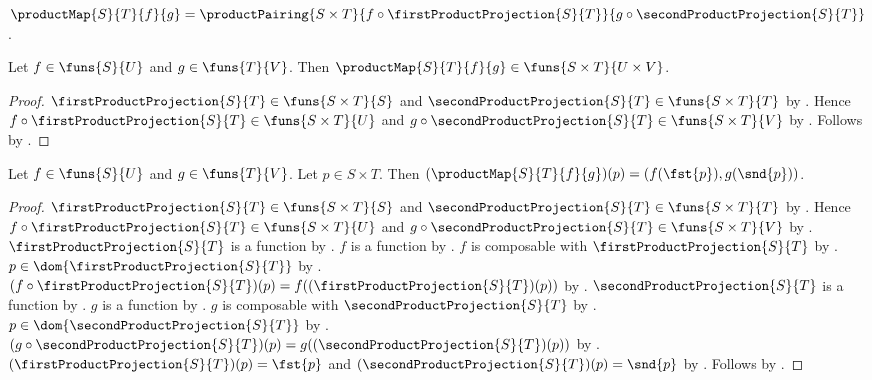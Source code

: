 \begin{definition}\label{product_map}
    $\productMap{S}{T}{f}{g}
        =\productPairing{S\times T}{
            f\circ\firstProductProjection{S}{T}}{
            g\circ\secondProductProjection{S}{T}}$.
\end{definition}

\begin{proposition}\label{product_map_type}
    Let $f\in\funs{S}{U}$ and $g\in\funs{T}{V}$.
    Then $\productMap{S}{T}{f}{g}\in
        \funs{S\times T}{U\times V}$.
\end{proposition}
\begin{proof}
    $\firstProductProjection{S}{T}\in\funs{S\times T}{S}$ and
        $\secondProductProjection{S}{T}\in\funs{S\times T}{T}$ by
        .
    Hence $f\circ\firstProductProjection{S}{T}
        \in\funs{S\times T}{U}$ and
        $g\circ\secondProductProjection{S}{T}
        \in\funs{S\times T}{V}$ by .
    Follows by .
\end{proof}

\begin{proposition}\label{product_map_apply}
    Let $f\in\funs{S}{U}$ and $g\in\funs{T}{V}$.
    Let $p\in S\times T$.
    Then $(\productMap{S}{T}{f}{g})(p)
        =(f(\fst{p}),g(\snd{p}))$.
\end{proposition}
\begin{proof}
    $\firstProductProjection{S}{T}\in\funs{S\times T}{S}$ and
        $\secondProductProjection{S}{T}\in\funs{S\times T}{T}$ by
        .
    Hence $f\circ\firstProductProjection{S}{T}
        \in\funs{S\times T}{U}$ and
        $g\circ\secondProductProjection{S}{T}
        \in\funs{S\times T}{V}$ by .
    $\firstProductProjection{S}{T}$ is a function by
        .
    $f$ is a function by .
    $f$ is composable with $\firstProductProjection{S}{T}$ by
        .
    $p\in\dom{\firstProductProjection{S}{T}}$ by .
    $(f\circ\firstProductProjection{S}{T})(p)
        =f((\firstProductProjection{S}{T})(p))$ by
        .
    $\secondProductProjection{S}{T}$ is a function by
        .
    $g$ is a function by .
    $g$ is composable with $\secondProductProjection{S}{T}$ by
        .
    $p\in\dom{\secondProductProjection{S}{T}}$ by .
    $(g\circ\secondProductProjection{S}{T})(p)
        =g((\secondProductProjection{S}{T})(p))$ by
        .
    $(\firstProductProjection{S}{T})(p)=\fst{p}$ and
        $(\secondProductProjection{S}{T})(p)=\snd{p}$ by
        .
    Follows by
        .
\end{proof}

